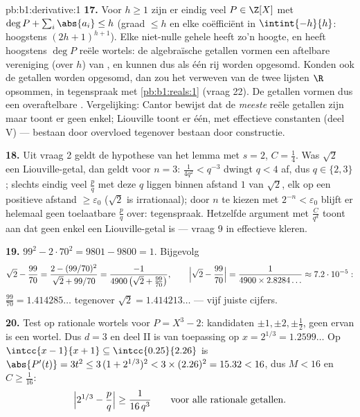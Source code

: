 \begin{solution}{pb:b1:derivative:1}
\textbf{17.} Voor $h \geq 1$ zijn er eindig veel $P \in \Z[X]$
met $\deg P + \sum_i \abs{a_i} \leq h$ (graad $\leq h$ en elke
coëfficiënt in $\intint{-h}{h}$: hoogstens $(2h+1)^{h+1}$). Elke
niet-nulle gehele  heeft zo'n hoogte, en heeft hoogstens
$\deg P$ reële wortels: de algebraïsche getallen vormen een
aftelbare vereniging (over $h$) van , en
kunnen dus als één rij worden opgesomd. Konden ook de
 getallen worden opgesomd, dan zou het verweven van
de twee lijsten $\R$ opsommen, in tegenspraak met
\cref{pb:b1:reals:1} (vraag 22). De  getallen vormen
dus een overaftelbare . Vergelijking: Cantor bewijst
dat de \emph{meeste} reële getallen  zijn maar toont
er geen enkel; Liouville toont er één, met effectieve constanten
(deel V) --- bestaan door overvloed tegenover bestaan door
constructie.

\textbf{18.} Uit vraag 2 geldt de hypothese van het lemma met $s
= 2$, $C = \frac14$. Was $\sqrt2$ een Liouville-getal, dan geldt
voor $n = 3$: $\frac{1}{4q^2} < q^{-3}$ dwingt $q < 4$ af, dus $q
\in \{2, 3\}$; slechts eindig veel $\frac pq$ met deze $q$ liggen
binnen afstand $1$ van $\sqrt2$, elk op een positieve afstand
$\geq \varepsilon_0$ ($\sqrt2$ is irrationaal); door $n$ te
kiezen met $2^{-n} < \varepsilon_0$ blijft er helemaal geen
toelaatbare $\frac pq$ over: tegenspraak. Hetzelfde argument met
$\frac{C}{q^d}$ toont aan dat geen enkel  een
Liouville-getal is --- vraag 9 in effectieve kleren.

\textbf{19.} $99^2 - 2\cdot70^2 = 9801 - 9800 = 1$. Bijgevolg
\[
\sqrt2 - \frac{99}{70} =
\frac{2 - (99/70)^2}{\sqrt2 + 99/70}
= \frac{-1}{4900\,\bigl(\sqrt2 + \tfrac{99}{70}\bigr)} ,
\qquad
\Bigl|\sqrt2 - \frac{99}{70}\Bigr|
= \frac{1}{4900 \times 2.8284\dots} \approx 7.2\cdot10^{-5} :
\]
$\frac{99}{70} = 1.414285\dots$ tegenover $\sqrt2 =
1.414213\dots$ --- vijf juiste cijfers.

\textbf{20.} Test op rationale wortels voor $P = X^3 - 2$:
kandidaten $\pm1, \pm2, \pm\frac12$, geen ervan is een wortel.
Dus $d = 3$ en deel II is van toepassing op $x = 2^{1/3} =
1.2599\dots$ Op $\intcc{x - 1}{x + 1} \subseteq \intcc{0.25}{2.26}$
is $\abs{P'(t)} = 3t^2 \leq 3\,(1 + 2^{1/3})^2 < 3\times(2.26)^2 =
15.32 < 16$, dus $M < 16$ en $C \geq \frac{1}{16}$:
\[
\Bigl|2^{1/3} - \frac pq\Bigr| \geq \frac{1}{16\,q^3}
\qquad\text{voor alle rationale getallen.}
\]


\end{solution}
